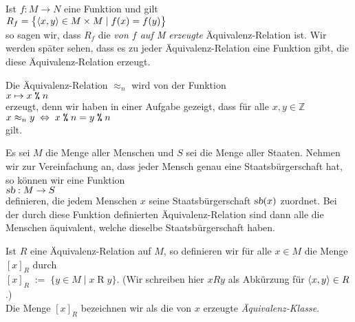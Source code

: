 \remark
Ist $f: M \rightarrow N$ eine Funktion und gilt
\\[0.2cm]
\hspace*{1.3cm}
$R_f = \bigl\{ \pair(x,y) \in M \times M \mid f(x) = f(y) \bigr\}$ 
\\[0.2cm]
so sagen wir, dass $R_f$ die \emph{von $f$ auf M erzeugte} \"{A}quivalenz-Relation ist.  Wir werden
sp\"{a}ter sehen, dass es zu jeder  \"{A}quivalenz-Relation eine Funktion gibt, die diese
\"{A}quivalenz-Relation erzeugt. \eox 


\example 
Die \"{A}quivalenz-Relation $\approx_n$ wird von der Funktion
\\[0.2cm]
\hspace*{1.3cm}
$x \mapsto x \;\texttt{\%}\; n$
\\[0.2cm]
erzeugt, denn wir haben in einer Aufgabe gezeigt, dass f\"{u}r alle $x,y \in \mathbb{Z}$ 
\\[0.2cm]
\hspace*{1.3cm}
$x \approx_n y \;\Leftrightarrow\; x \;\texttt{\%}\; n = y \;\texttt{\%}\; n$
\\[0.2cm]
gilt.
\eox


\example
Es sei $M$ die Menge aller Menschen und $S$ sei die Menge aller Staaten.  Nehmen wir zur
Vereinfachung an, dass jeder Mensch genau eine Staatsb\"{u}rgerschaft hat, so k\"{o}nnen wir eine Funktion
\\[0.2cm]
\hspace*{1.3cm}
$\textsl{sb}: M \rightarrow S$
\\[0.2cm]
definieren, die jedem Menschen $x$ seine Staatsb\"{u}rgerschaft $\textsl{sb}(x)$ zuordnet.  Bei der durch
diese Funktion definierten \"{A}quivalenz-Relation sind dann alle die Menschen \"{a}quivalent, welche dieselbe
Staatsb\"{u}rgerschaft haben.  \eox

\begin{Definition}
Ist $R$ eine \"{A}quivalenz-Relation auf $M$, so definieren wir f\"{u}r alle $x \in M$ 
die Menge $[x]_R$ durch \\[0.2cm]
\hspace*{1.3cm} $[x]_R \;:=\; \bigl\{ y \in M \mid x \mathop{R} y \bigr\}$. \qquad
(Wir schreiben hier $x R y$ als Abk\"{u}rzung f\"{u}r $\pair(x, y) \in R$.) 
\\[0.2cm]
Die Menge $[x]_R$ bezeichnen wir als die von $x$ erzeugte \emph{\"{A}quivalenz-Klasse}.  \eox
\end{Definition}

